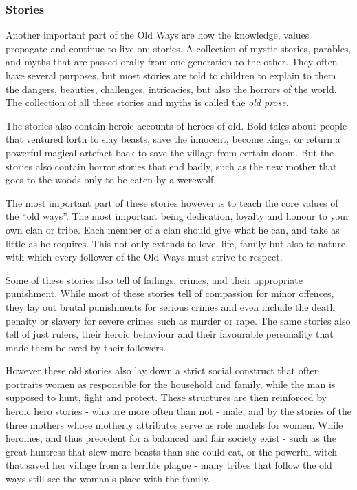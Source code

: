 
\subsubsection{Stories}

Another important part of the Old Ways are how the knowledge, values propagate
and continue to live on: stories. A collection of mystic stories, parables,
and myths that are passed orally from one generation to the other. They often
have several purposes, but most stories are told to children to explain to
them the dangers, beauties, challenges, intricacies, but also the horrors of
the world. The collection of all these stories and myths is called the
\emph{old prose}.

The stories also contain heroic accounts of heroes of old. Bold tales about
people that ventured forth to slay beasts, save the innocent, become kings, or
return a powerful magical artefact back to save the village from certain doom.
But the stories also contain horror stories that end badly, such as the new
mother that goes to the woods only to be eaten by a werewolf.

The most important part of these stories however is to teach the core values
of the ``old ways''. The most important being dedication, loyalty and honour
to your own clan or tribe. Each member of a clan should give what he can, and
take as little as he requires. This not only extends to love, life, family but
also to nature, with which every follower of the Old Ways must strive to
respect.

Some of these stories also tell of failings, crimes, and their appropriate
punishment. While most of these stories tell of compassion for minor offences,
they lay out brutal punishments for serious crimes and even include the death
penalty or slavery for severe crimes such as murder or rape. The same stories
also tell of just rulers, their heroic behaviour and their favourable
personality that made them beloved by their followers.

However these old stories also lay down a strict social construct that often
portraits women as responsible for the household and family, while the man is
supposed to hunt, fight and protect. These structures are then reinforced by
heroic hero stories - who are more often than not - male, and by the stories
of the three mothers whose motherly attributes serve as role models for women.
While heroines, and thus precedent for a balanced and fair society exist - such
as the great huntress  that slew more beasts than she could
eat, or the powerful witch  that saved her village from a
terrible plague - many tribes that follow the old ways still see the woman's
place with the family.


